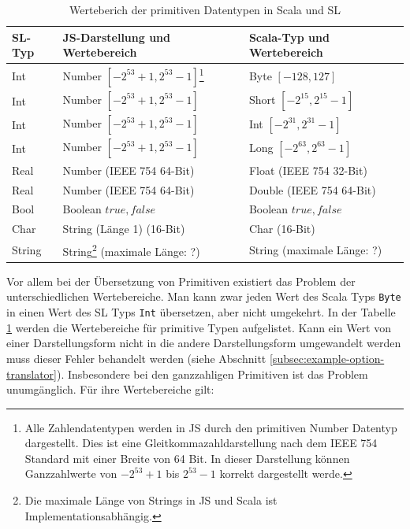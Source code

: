\documentclass[12pt,bibtotoc]{scrreprt}
\begin{document}
\begin{savenotes}
\begin{table}[h]
\caption{Werteberich der primitiven Datentypen in Scala und SL\cite[S. 28-30]{Ecma2011}\cite{Oracle2011}}
\centering
\begin{tabular}{lll}
SL-Typ & JS-Darstellung und Wertebereich & Scala-Typ und Wertebereich \\
\midrule
Int    & Number $[-2^{53} + 1, 2^{53} -1]$\footnote{Alle Zahlendatentypen werden in \ac{JS} durch den primitiven Number Datentyp dargestellt. Dies ist eine Gleitkommazahldarstellung nach dem IEEE 754 Standard mit einer Breite von 64 Bit. In dieser Darstellung können Ganzzahlwerte von $-2^{53} + 1$ bis $2^{53} -1$ korrekt dargestellt werde.}    &  Byte  $[-128, 127]$\\
Int    & Number $[-2^{53} + 1, 2^{53} -1]$ & Short $[-2^{15}, 2^{15}-1]$\\
Int    & Number $[-2^{53} + 1, 2^{53} -1]$ & Int   $[-2^{31}, 2^{31}-1]$\\
Int    & Number $[-2^{53} + 1, 2^{53} -1]$ & Long  $[-2^{63}, 2^{63}-1]$\\
\addlinespace
Real   & Number (IEEE 754 64-Bit)          & Float  (IEEE 754 32-Bit)\\
Real   & Number (IEEE 754 64-Bit)          & Double (IEEE 754 64-Bit)\\
\addlinespace
Bool   & Boolean ${true, false}$           & Boolean ${true, false}$\\
\addlinespace
Char   & String (Länge 1) (16-Bit)         & Char (16-Bit)\\
\addlinespace
String& String\footnote{Die maximale Länge von Strings in \ac{JS} und Scala ist Implementationsabhängig.} (maximale Länge: ?)    &  String (maximale Länge: ?)\\
\end{tabular}
\label{tab:primitives-borders}
\end{table}
\end{savenotes}

Vor allem bei der Übersetzung von Primitiven existiert das Problem der unterschiedlichen Wertebereiche. Man kann zwar jeden Wert des Scala Typs \lstinline!Byte! in einen Wert des SL Typs \lstinline!Int! übersetzen, aber nicht umgekehrt. In der Tabelle \ref{tab:primitives-borders} werden die Wertebereiche für primitive Typen aufgelistet. Kann ein Wert von einer Darstellungsform nicht in die andere Darstellungsform umgewandelt werden muss dieser Fehler behandelt werden (siehe Abschnitt \ref{subsec:example-option-translator}). Insbesondere bei den ganzzahligen Primitiven ist das Problem unumgänglich.  Für ihre Wertebereiche gilt:
\end{document}
